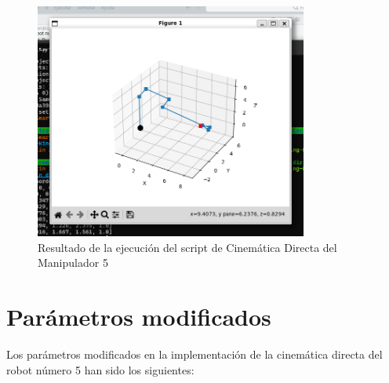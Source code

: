 \documentclass[11pt]{report}
\begin{document}
\begin{figure}[H]
    \centering
    \includegraphics[width=0.8\textwidth]{src/img/Manipulador-5-resultado.png}
    \caption{Resultado de la ejecución del script de Cinemática Directa del Manipulador 5}
    \label{fig:robot5-result}
\end{figure}

\section{Parámetros modificados}

Los parámetros modificados en la implementación de la cinemática directa del robot número 5 han sido los siguientes:
\end{document}
